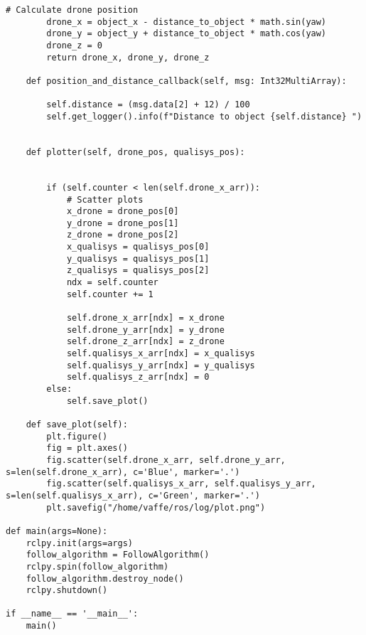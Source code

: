 \begin{lstlisting}[language=PythonPlus, basicstyle=\tiny,]
        # Calculate drone position
        drone_x = object_x - distance_to_object * math.sin(yaw)
        drone_y = object_y + distance_to_object * math.cos(yaw)
        drone_z = 0
        return drone_x, drone_y, drone_z

    def position_and_distance_callback(self, msg: Int32MultiArray):

        self.distance = (msg.data[2] + 12) / 100
        self.get_logger().info(f"Distance to object {self.distance} ")
       

    def plotter(self, drone_pos, qualisys_pos):


        if (self.counter < len(self.drone_x_arr)):
            # Scatter plots
            x_drone = drone_pos[0]
            y_drone = drone_pos[1]
            z_drone = drone_pos[2]
            x_qualisys = qualisys_pos[0]
            y_qualisys = qualisys_pos[1]
            z_qualisys = qualisys_pos[2]
            ndx = self.counter
            self.counter += 1

            self.drone_x_arr[ndx] = x_drone
            self.drone_y_arr[ndx] = y_drone
            self.drone_z_arr[ndx] = z_drone
            self.qualisys_x_arr[ndx] = x_qualisys
            self.qualisys_y_arr[ndx] = y_qualisys
            self.qualisys_z_arr[ndx] = 0
        else:
            self.save_plot()

    def save_plot(self):
        plt.figure()
        fig = plt.axes()
        fig.scatter(self.drone_x_arr, self.drone_y_arr, s=len(self.drone_x_arr), c='Blue', marker='.')
        fig.scatter(self.qualisys_x_arr, self.qualisys_y_arr, s=len(self.qualisys_x_arr), c='Green', marker='.')
        plt.savefig("/home/vaffe/ros/log/plot.png")

def main(args=None):
    rclpy.init(args=args)
    follow_algorithm = FollowAlgorithm()
    rclpy.spin(follow_algorithm)
    follow_algorithm.destroy_node()
    rclpy.shutdown()

if __name__ == '__main__':
    main()

\end{lstlisting}